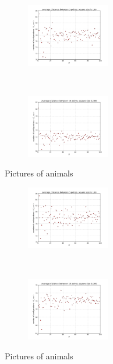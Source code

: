 \documentclass[a4paper,10pt]{article}
\begin{document}
\begin{figure}
        \centering
        \begin{subfigure}[b]{0.3\textwidth}
		\centering
		\includegraphics[width=0.4\textwidth]{solR1n5}
        \end{subfigure}%
        ~ %
        \begin{subfigure}[b]{0.3\textwidth}
		\centering
		\includegraphics[width=0.4\textwidth]{solR1n10}
        \end{subfigure}%
        \caption{Pictures of animals}
        \label{fig:animals}
\end{figure}

\begin{figure}
        \centering
        \begin{subfigure}[b]{0.3\textwidth}
		\centering
		\includegraphics[width=0.4\textwidth]{solR5n5}
        \end{subfigure}%
        ~ %
        \begin{subfigure}[b]{0.3\textwidth}
		\centering
		\includegraphics[width=0.4\textwidth]{solR10n10}
        \end{subfigure}%
        \caption{Pictures of animals}
        \label{fig:animals}
\end{figure}
\end{document}
